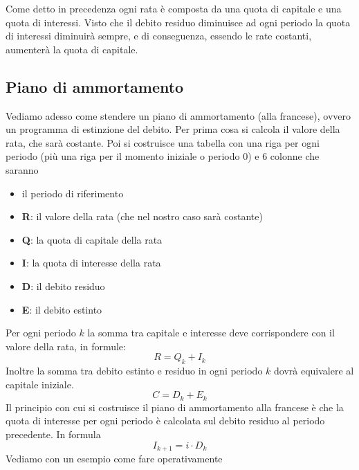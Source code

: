 Come detto in precedenza ogni rata è composta da una quota di capitale e 
una quota di interessi. Visto che il debito residuo diminuisce ad ogni 
periodo la quota di interessi diminuirà sempre, e di conseguenza, essendo le 
rate costanti, aumenterà la quota di capitale.

\subsection{Piano di ammortamento}
Vediamo adesso come stendere un piano di ammortamento (alla francese), 
ovvero un programma di estinzione del debito. 
Per prima cosa si calcola il valore della rata, che sarà costante.
Poi si costruisce una tabella con una riga per ogni periodo (più una riga 
per il momento iniziale o periodo \(0\)) e 6 colonne che saranno
\begin{itemize}
\item il periodo di riferimento
\item \textbf{R}: il valore della rata (che nel nostro caso sarà costante)
\item \textbf{Q}: la quota di capitale della rata
\item \textbf{I}: la quota di interesse della rata
\item \textbf{D}: il debito residuo
\item \textbf{E}: il debito estinto
\end{itemize}
Per ogni periodo \(k\) la somma tra capitale e interesse deve corrispondere 
con il valore della rata, in formule:
\[R=Q_k+I_k\]
Inoltre la somma tra debito estinto e residuo in ogni periodo \(k\) dovrà 
equivalere al capitale iniziale.
\[C=D_k+E_k\]
Il principio con cui si costruisce il piano di ammortamento alla francese è 
che la quota di interesse per ogni periodo è calcolata sul debito residuo 
al periodo precedente. In formula
\[I_{k+1}=i\cdot D_k\]
Vediamo con un esempio come fare operativamente

